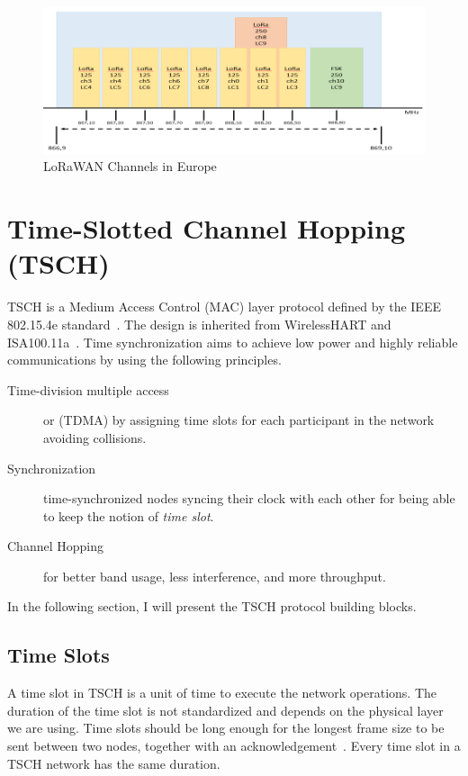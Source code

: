 \begin{figure}[H]
  \centering
  \includegraphics[width=\textwidth]{thesis.tex/chapters/context/fig/channels.png}
  \caption{LoRaWAN Channels in Europe\cite{Polonelli_2019}\label{fig:channels}}
\end{figure}


\section{Time-Slotted Channel Hopping (TSCH)}

TSCH is a Medium Access Control (MAC) layer protocol defined by the IEEE
802.15.4e standard~\cite{rfc7554}.
The design is inherited from WirelessHART and
ISA100.11a~\cite{Duquennoy2017TSCHA6}.
Time synchronization aims to achieve low power and highly reliable
communications by using the following principles.

\begin{description}
  \item[Time-division multiple access] or (TDMA) by assigning time slots for each
    participant in the network avoiding collisions.
  \item[Synchronization] time-synchronized nodes syncing their clock with each
    other for being able to keep the notion of \emph{time slot}.
  \item[Channel Hopping] for better band usage, less interference, and more
    throughput.
\end{description}

In the following section, I will present the TSCH protocol building blocks.

\subsection{Time Slots}

A time slot in TSCH is a unit of time to execute the network operations. 
The duration of the time slot is not standardized and depends on the physical 
layer we are using. 
Time slots should be long enough for the longest frame size to be sent
between two nodes, together with an acknowledgement~\cite{rfc7554}. 
Every time slot in a TSCH network has the same duration.

